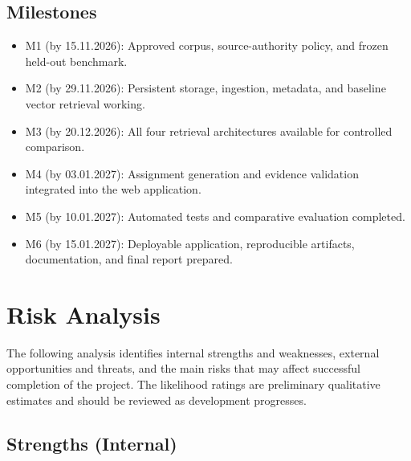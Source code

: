 \documentclass[12pt,a4paper]{article}
\begin{document}
\subsection*{Milestones}

\begin{itemize}
    \item M1 (by 15.11.2026): Approved corpus, source-authority
    policy, and frozen held-out benchmark.

    \item M2 (by 29.11.2026): Persistent storage, ingestion,
    metadata, and baseline vector retrieval working.

    \item M3 (by 20.12.2026): All four retrieval architectures
    available for controlled comparison.

    \item M4 (by 03.01.2027): Assignment generation and evidence
    validation integrated into the web application.

    \item M5 (by 10.01.2027): Automated tests and comparative
    evaluation completed.

    \item M6 (by 15.01.2027): Deployable application, reproducible
    artifacts, documentation, and final report prepared.
\end{itemize}

\clearpage

\section{Risk Analysis}
\label{sec:risk}

The following analysis identifies internal strengths and
weaknesses, external opportunities and threats, and the main
risks that may affect successful completion of the project.
The likelihood ratings are preliminary qualitative estimates
and should be reviewed as development progresses.

\subsection{Strengths (Internal)}
\end{document}
